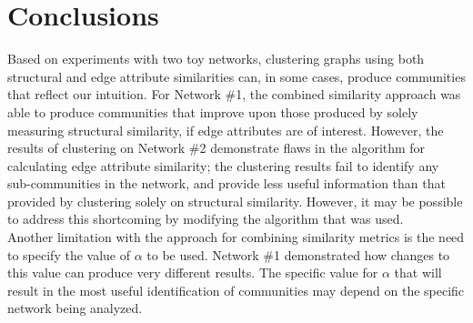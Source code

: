 \documentclass{report} %
\begin{document}
\newpage
\section*{Conclusions}

Based on experiments with two toy networks, clustering graphs using both structural and edge attribute similarities can, in some cases, produce communities that reflect our intuition. For Network \#1, the combined similarity approach was able to produce communities that improve upon those produced by solely measuring structural similarity, if edge attributes are of interest. However, the results of clustering on Network \#2 demonstrate flaws in the algorithm for calculating edge attribute similarity; the clustering results fail to identify any sub-communities in the network, and provide less useful information than that provided by clustering solely on structural similarity. However, it may be possible to address this shortcoming by modifying the algorithm that was used.\\

Another limitation with the approach for combining similarity metrics is the need to specify the value of $\alpha$ to be used. Network \#1 demonstrated how changes to this value can produce very different results. The specific value for $\alpha$ that will result in the most useful identification of communities may depend on the specific network being analyzed.



\end{document}
